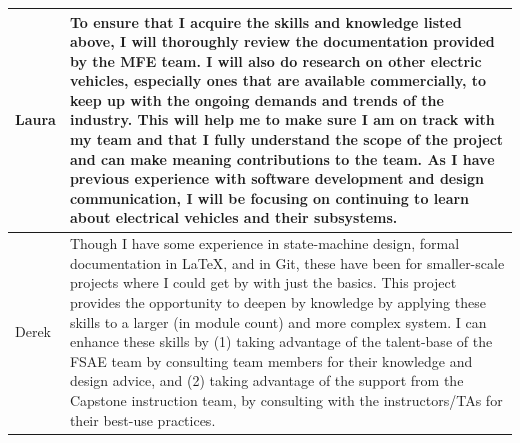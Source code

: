 \documentclass[12pt]{article}
\begin{document}
\begin{tabular}{| p{} | p{}|}
    \hline
    Laura & To ensure that I acquire the skills and knowledge listed above, I will thoroughly review the documentation provided by the MFE team. I will also do research on other electric vehicles, especially ones that are available commercially, to 
    keep up with the ongoing demands and trends of the industry. This will help me to make sure I am on track with my team and that I fully understand the scope of the project and can make meaning contributions to the team. As I have previous experience 
    with software development and design communication, I will be focusing on continuing to learn about electrical vehicles and their subsystems.\\
    \hline
    Derek & Though I have some experience in state-machine design, formal documentation in LaTeX, and in Git, these have been for smaller-scale projects where I could get by with just the basics. This project provides the opportunity to deepen by knowledge 
    by applying these skills to a larger (in module count) and more complex system. I can enhance these skills by (1) taking advantage of the talent-base of the FSAE team by consulting team members for their knowledge and design advice, and (2) taking 
    advantage of the support from the Capstone instruction team, by consulting with the instructors/TAs for their best-use practices.\\
    \hline
\end{tabular}
\end{document}
